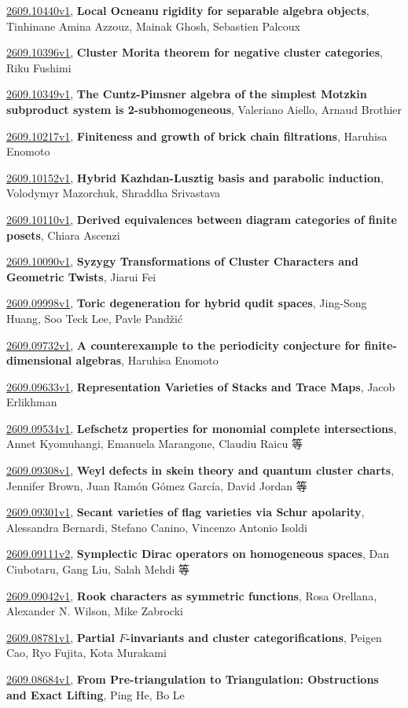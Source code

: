 \documentclass[9pt, a4paper]{article}
\theoremstyle{plain}
\theoremstyle{definition}
\theoremstyle{remark}
\newcommand{\arxiv}[3]{\href{https://arxiv.org/abs/#1}{#1}, \textbf{\textcolor{arxivblue}{#2}}, #3}
\begin{document}
\arxiv{2609.10440v1}{Local Ocneanu rigidity for separable algebra objects}{Tinhinane Amina Azzouz, Mainak Ghosh, Sebastien Palcoux}

\arxiv{2609.10396v1}{Cluster Morita theorem for negative cluster categories}{Riku Fushimi}

\arxiv{2609.10349v1}{The Cuntz-Pimsner algebra of the simplest Motzkin subproduct system is 2-subhomogeneous}{Valeriano Aiello, Arnaud Brothier}

\arxiv{2609.10217v1}{Finiteness and growth of brick chain filtrations}{Haruhisa Enomoto}

\arxiv{2609.10152v1}{Hybrid Kazhdan-Lusztig basis and parabolic induction}{Volodymyr Mazorchuk, Shraddha Srivastava}

\arxiv{2609.10110v1}{Derived equivalences between diagram categories of finite posets}{Chiara Ascenzi}

\arxiv{2609.10090v1}{Syzygy Transformations of Cluster Characters and Geometric Twists}{Jiarui Fei}

\arxiv{2609.09998v1}{Toric degeneration for hybrid qudit spaces}{Jing-Song Huang, Soo Teck Lee, Pavle Pandžić}

\arxiv{2609.09732v1}{A counterexample to the periodicity conjecture for finite-dimensional algebras}{Haruhisa Enomoto}

\arxiv{2609.09633v1}{Representation Varieties of Stacks and Trace Maps}{Jacob Erlikhman}

\arxiv{2609.09534v1}{Lefschetz properties for monomial complete intersections}{Annet Kyomuhangi, Emanuela Marangone, Claudiu Raicu 等}

\arxiv{2609.09308v1}{Weyl defects in skein theory and quantum cluster charts}{Jennifer Brown, Juan Ramón Gómez García, David Jordan 等}

\arxiv{2609.09301v1}{Secant varieties of flag varieties via Schur apolarity}{Alessandra Bernardi, Stefano Canino, Vincenzo Antonio Isoldi}

\arxiv{2609.09111v2}{Symplectic Dirac operators on homogeneous spaces}{Dan Ciubotaru, Gang Liu, Salah Mehdi 等}

\arxiv{2609.09042v1}{Rook characters as symmetric functions}{Rosa Orellana, Alexander N. Wilson, Mike Zabrocki}

\arxiv{2609.08781v1}{Partial $F$-invariants and cluster categorifications}{Peigen Cao, Ryo Fujita, Kota Murakami}

\arxiv{2609.08684v1}{From Pre-triangulation to Triangulation: Obstructions and Exact Lifting}{Ping He, Bo Le}
\end{document}
